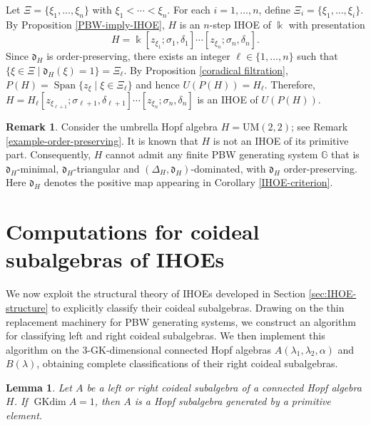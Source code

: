 \documentclass{article}
\makeatletter
\renewenvironment{proof}[1][\proofname]{\par
	\pushQED{\qed}%
	\normalfont \topsep6\p@\@plus6\p@\relax
	\trivlist
	\item[\hskip\labelsep
	\bfseries
	#1\@addpunct{.}]\ignorespaces
}{%
	\popQED\endtrivlist\@endpefalse
}
\theoremstyle{plain}
\newtheorem{lemma}[thm]{Lemma}
\theoremstyle{definition}
\newtheorem{remark}[thm]{Remark}
\numberwithin{equation}{section}
\DeclareMathOperator{\Span}{Span}
\DeclareMathOperator{\GKdim}{GKdim}
\newcommand{\GG}{\mathbb{G}}
\newcommand{\dd}{\mathfrak{d}}
\makeatother
\begin{document}
	\begin{proof}
		Let $\Xi=\{\xi_{1},\ldots, \xi_{n}\}$ with $\xi_{1} < \cdots < \xi_{n}$. For each $i=1,\ldots, n$, define $\Xi_{i}= \{\xi_{1},\ldots, \xi_{i}\}$.  By Proposition \ref{PBW-imply-IHOE}, $H$ is an $n$-step IHOE of $\Bbbk$ with presentation
		\[
		H=\Bbbk[z_{\xi_{1}};\sigma_{1},\delta_{1}]\cdots [z_{\xi_{n}};\sigma_{n},\delta_{n}].
		\]
		Since $\dd_{H}$ is order-preserving, there exists an integer $\ell\in\{1,\ldots, n\}$ such that $\{\xi\in \Xi\mid \dd_{H}(\xi) =1\} = \Xi_{\ell}$. By Proposition \ref{coradical filtration}, $P(H) =\Span\{z_{\xi} \mid \xi\in \Xi_{\ell}\}$ and hence $U(P(H)) =H_{\ell}$. Therefore, $H=H_{\ell}[z_{\xi_{\ell+1}};\sigma_{\ell+1},\delta_{\ell+1}]\cdots [z_{\xi_{n}};\sigma_{n},\delta_{n}]$ is an  IHOE of $U(P(H))$.
	\end{proof}
	
	\begin{remark}
		Consider the umbrella Hopf algebra $H=\mathrm{UM}(2,2)$; see Remark \ref{example-order-preserving}. It is known that $H$ is not an IHOE of its primitive part. Consequently, $H$ cannot admit any finite PBW generating system $\GG$ that is $\dd_{H}$-minimal, $\dd_{H}$-triangular and $(\Delta_{H},\dd_{H})$-dominated, with $\dd_{H}$ order-preserving. Here $\dd_{H}$ denotes the positive map appearing in Corollary \ref{IHOE-criterion}.
	\end{remark}
	
	
	\section{Computations for coideal subalgebras of IHOEs}
	\label{sec:classification}
	
	We now exploit the structural theory of IHOEs developed in Section \ref{sec:IHOE-structure} to explicitly classify their coideal subalgebras. Drawing on the thin replacement machinery for PBW generating systems, we construct an algorithm for classifying left and  right coideal subalgebras. We then implement this algorithm on the $3$-GK-dimensional connected Hopf algebras $A(\lambda_{1},\lambda_{2},\alpha)$ and $B(\lambda)$, obtaining complete classifications of their right coideal subalgebras.
	
	
	\begin{lemma}\label{coideal-GK-dimension-one}
		Let $A$ be a left or right coideal subalgebra of a connected Hopf algebra $H$. If $\GKdim A = 1$, then $A$ is a Hopf subalgebra generated by a primitive element.
	\end{lemma}
	
\end{document}
